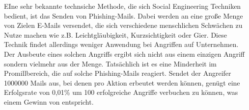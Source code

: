 EIne sehr bekannte technsiche Methode, die sich Social Engineering Techniken bedient, ist das Senden von Phishing-Mails. Dabei werden an eine große Menge von Zielen E-Mails versendet, die sich verschiedene menschlichen Schwächen zu Nutze machen wie z.B. Leichtgläubigkeit, Kurzsichtigkeit oder Gier. Diese Technik findet allerdings weniger Anwendung bei Angriffen auf Unternehmen. Der Ausbeute eines solchen Angriffs ergibt sich nicht aus einem einzigen Angriff sondern vielmehr aus der Menge. Tatsächlich ist es eine Minderheit im Promillbereich, die auf solche Phishing-Mails reagiert. Sendet der Angreifer 1000000 Mails aus, bei denen pro Aktion  erbeutet werden können, genügt eine Erfolgsrate von 0,01\% um 100 erfolgreiche Angriffe verbuchen zu können, was einem Gewinn von  entspricht.